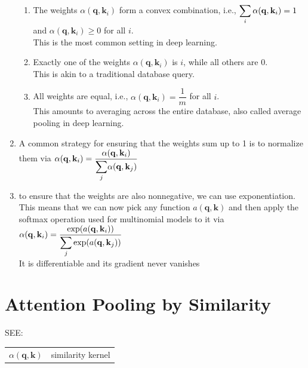 \begin{enumerate}[itemsep=0.15cm]
\begin{enumerate}[itemsep=0.1cm]
        \item The weights $\alpha(\mathbf{q}, \mathbf{k}_i)$ form a convex combination, i.e., $\displaystyle\sum_i \alpha(\mathbf{q}, \mathbf{k}_i) = 1$ and $\alpha(\mathbf{q}, \mathbf{k}_i) \geq 0$ for all $i$.\\
        This is the most common setting in deep learning.

        \item Exactly one of the weights $\alpha(\mathbf{q}, \mathbf{k}_i)$ is $i$, while all others are $0$.\\
        This is akin to a traditional database query.

        \item All weights are equal, i.e., $\alpha(\mathbf{q}, \mathbf{k}_i) = \dfrac{1}{m}$ for all $i$.\\
        This amounts to averaging across the entire database, also called average pooling in deep learning.
    \end{enumerate}

    \item A common strategy for ensuring that the weights sum up to 1 is to normalize them via
    $
        \alpha(\mathbf{q}, \mathbf{k}_i) = \dfrac{\alpha(\mathbf{q}, \mathbf{k}_i)}{{\displaystyle\sum_j} \alpha(\mathbf{q}, \mathbf{k}_j)}
    $

    \item to ensure that the weights are also nonnegative, we can use exponentiation.\\
    This means that we can now pick any function $a(\mathbf{q}, \mathbf{k})$ and then apply the softmax operation used for multinomial models to it via
    $
        \alpha(\mathbf{q}, \mathbf{k}_i) = \dfrac{\exp(a(\mathbf{q}, \mathbf{k}_i))}{\displaystyle\sum_j \exp(a(\mathbf{q}, \mathbf{k}_j))}
    $\\
    It is differentiable and its gradient never vanishes

\end{enumerate}



\section{Attention Pooling by Similarity \cite{dnn-1}}

SEE: 

\begin{customTableWrapper}{1.5}
\begin{longtable}{l p{8cm}}
    $\alpha(\mathbf{q}, \mathbf{k})$ & similarity kernel \\

    
\end{longtable}
\end{customTableWrapper}

